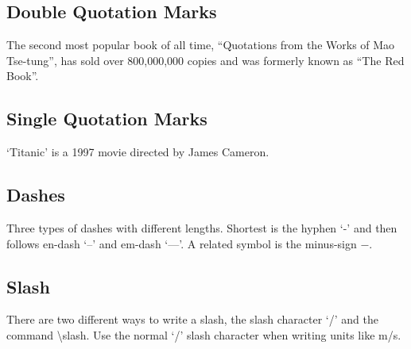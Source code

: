 \documentclass{article}
\begin{document}
\subsection*{Double Quotation Marks}
The second most popular book of all time, ``Quotations from the Works of Mao Tse-tung'', has sold over 800,000,000 copies and was formerly known as ``The Red Book''.

\subsection*{Single Quotation Marks}
`Titanic' is a 1997 movie directed by James Cameron.

\subsection*{Dashes}
Three types of dashes with different lengths. Shortest is the hyphen `-' and then follows en-dash `--' and em-dash `---'. A related symbol is the minus-sign $-$.

\subsection*{Slash}
There are two different ways to write a slash, the slash character `/' and the command \textbackslash slash. Use the normal `/' slash character when writing units like m/s.
\end{document}
